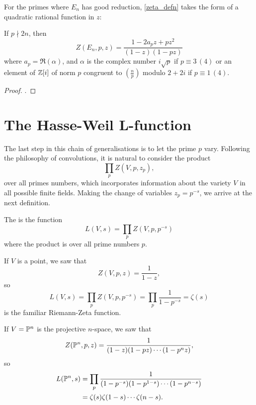 \documentclass[12pt, a4paper]{report}
\begin{document}
For the primes where $E_n$ has good reduction, \autoref{zeta_defn} takes
the form of a quadratic rational function in $z$:

\begin{prop} \label{zeta_elliptic}
  If $p \nmid 2n$, then
  \[Z(E_n, p, z) = \frac{1 - 2a_pz + pz^2}{(1-z)(1-pz)} \]
  where $a_p = \Re(\alpha)$, and $\alpha$ is the complex number
  $i\sqrt{p}$ if $p \equiv 3 \, (4)$ or an element of ${\mathbb Z}[i]$ of
  norm $p$ congruent to $(\frac{n}{p})$ modulo $2+2i$ if $p \equiv 1 \, (4)$. 
\end{prop}

\begin{proof}
  \cite[See][Chater II-2, pages 59-61]{koblitz}.
\end{proof}



\section{The Hasse-Weil L-function}

The last step in this chain of generalisations is to let the prime $p$ vary.
Following the
philosophy of convolutions, it is natural to consider the product
\[\prod\limits_{p} Z(V, p, z_p),\]
over all primes numbers,
which incorporates information about the variety $V$ in all possible finite
fields. Making the change of variables $z_p = p^{-s}$, we arrive at the next definition.

\begin{defn}
  The  is the function
  \[L(V,s) = \prod \limits_p Z(V,p,p^{-s})\]
  where the product is over all prime numbers $p$.
\end{defn}

\begin{example}
  If $V$ is a point, we saw that
  \[Z(V,p,z) = \frac{1}{1-z},\]
  so
  \[L(V,s) = \prod\limits_p Z(V,p,p^{-s}) = \prod\limits_p \frac{1}{1-p^{-s}} = \zeta(s)\]
  is the familiar Riemann-Zeta function.
\end{example}

\begin{example}
  If $V = {\mathbb P}^n$ is the projective $n$-space, we saw that
  \[Z({\mathbb P}^n,p,z) = \frac{1}{(1-z)(1-pz) \cdots (1-p^nz)},\]
  so
  \[
    \begin{split}
      L({\mathbb P}^n,s) &= \prod\limits_p \frac{1}{(1-p^{-s})(1-p^{1-s}) \cdots
        (1-p^{n-s})} \\
      &= \zeta(s) \zeta(1-s) \cdots \zeta(n-s).
    \end{split}
\]
\end{example}
\end{document}
